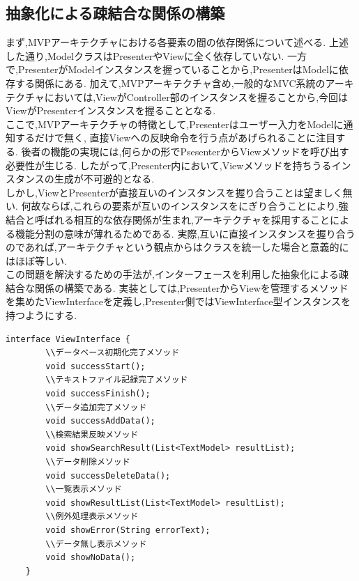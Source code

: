 \documentclass[12pt]{jarticle}
\begin{document}
\subsection{抽象化による疎結合な関係の構築}
まず,MVPアーキテクチャにおける各要素の間の依存関係について述べる.
上述した通り,ModelクラスはPresenterやViewに全く依存していない.
一方で,PresenterがModelインスタンスを握っていることから,PresenterはModelに依存する関係にある.
加えて,MVPアーキテクチャ含め,一般的なMVC系統のアーキテクチャにおいては,ViewがController部のインスタンスを握ることから,今回はViewがPresenterインスタンスを握ることとなる. \\
ここで,MVPアーキテクチャの特徴として,Presenterはユーザー入力をModelに通知するだけで無く, 直接Viewへの反映命令を行う点があげられることに注目する.
後者の機能の実現には,何らかの形でPsesenterからViewメソッドを呼び出す必要性が生じる.
したがって,Presenter内において,Viewメソッドを持ちうるインスタンスの生成が不可避的となる. \\
しかし,ViewとPresenterが直接互いのインスタンスを握り合うことは望ましく無い.
何故ならば,これらの要素が互いのインスタンスをにぎり合うことにより,強結合と呼ばれる相互的な依存関係が生まれ,アーキテクチャを採用することによる機能分割の意味が薄れるためである.
実際,互いに直接インスタンスを握り合うのであれば,アーキテクチャという観点からはクラスを統一した場合と意義的にはほぼ等しい. \\
この問題を解決するための手法が,インターフェースを利用した抽象化による疎結合な関係の構築である.
実装としては,PresenterからViewを管理するメソッドを集めたViewInterfaceを定義し,Presenter側ではViewInterface型インスタンスを持つようにする.
\begin{lstlisting}[caption=ViewInterfaceの定義, label=mid]
    interface ViewInterface {
        \\データベース初期化完了メソッド
        void successStart();
        \\テキストファイル記録完了メソッド
        void successFinish();
        \\データ追加完了メソッド
        void successAddData();
        \\検索結果反映メソッド
        void showSearchResult(List<TextModel> resultList);
        \\データ削除メソッド
        void successDeleteData();
        \\一覧表示メソッド
        void showResultList(List<TextModel> resultList);
        \\例外処理表示メソッド
        void showError(String errorText);
        \\データ無し表示メソッド
        void showNoData();
    }
\end{lstlisting}
\end{document}
